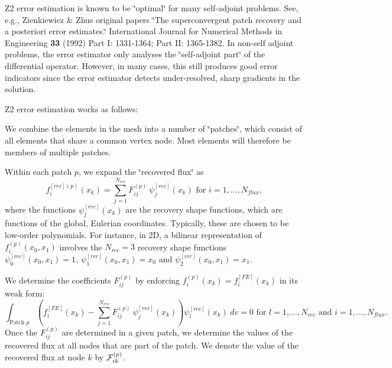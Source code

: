 Z2 error estimation is known to be \char`\"{}optimal\char`\"{} for many self-\/adjoint problems. See, e.\+g., Zienkiewicz \& Zhu\textquotesingle{}s original papers \char`\"{}\+The superconvergent patch recovery and a posteriori error estimates.\char`\"{} International Journal for Numerical Methods in Engineering {\bfseries 33} (1992) Part I\+: 1331-\/1364; Part II\+: 1365-\/1382. In non-\/self adjoint problems, the error estimator only analyses the \char`\"{}self-\/adjoint part\char`\"{} of the differential operator. However, in many cases, this still produces good error indicators since the error estimator detects under-\/resolved, sharp gradients in the solution.

Z2 error estimation works as follows\+:
\begin{DoxyEnumerate}
\item We combine the elements in the mesh into a number of \char`\"{}patches\char`\"{}, which consist of all elements that share a common vertex node. Most elements will therefore be members of multiple patches.
\item Within each patch $p$, we expand the \char`\"{}recovered flux\char`\"{} as \[ f^{[rec](p)}_i(x_k) = \sum_{j=1}^{N_{rec}} F^{(p)}_{ij} \ \psi^{[rec]}_j(x_k) \mbox{ \ \ \ for $i=1,...,N_{flux}$,} \] where the functions $ \psi^{[rec]}_j(x_k)$ are the recovery shape functions, which are functions of the global, Eulerian coordinates. Typically, these are chosen to be low-\/order polynomials. For instance, in 2D, a bilinear representation of $ f^{(p)}_i(x_0,x_1) $ involves the $N_{rec}=3$ recovery shape functions $ \psi^{[rec]}_0(x_0,x_1)=1, \ \psi^{[rec]}_1(x_0,x_1)=x_0 $ and $ \psi^{[rec]}_2(x_0,x_1)=x_1$.

We determine the coefficients $ F^{(p)}_{ij} $ by enforcing $ f^{(p)}_i(x_k) = f^{[FE]}_i(x_k)$ in its weak form\+: \[ \int_{\mbox{Patch $p$}} \left( f^{[FE]}_i(x_k) - \sum_{j=1}^{N_{rec}} F^{(p)}_{ij} \ \psi^{[rec]}_j(x_k) \right) \psi^{[rec]}_l(x_k)\ dv = 0 \mbox{ \ \ \ \ for $l=1,...,N_{rec}$ and $i=1,...,N_{flux}$}. \] Once the $ F^{(p)}_{ij} $ are determined in a given patch, we determine the values of the recovered flux at all nodes that are part of the patch. We denote the value of the recovered flux at node $ k $ by $ {\cal F}^{(p)}_{ik}$.


\end{DoxyEnumerate}
